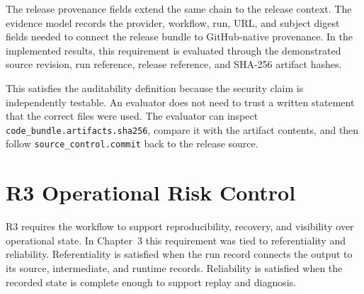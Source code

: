 The release provenance fields extend the same chain to the release context. The
evidence model records the provider, workflow, run, URL, and subject digest
fields needed to connect the release bundle to GitHub-native provenance. In
the implemented results, this requirement is evaluated through the demonstrated
source revision, run reference, release reference, and SHA-256 artifact hashes.

This satisfies the auditability definition because the security claim is
independently testable. An evaluator does not need to trust a written statement
that the correct files were used. The evaluator can inspect
\texttt{code\_bundle.artifacts.sha256}, compare it with the artifact contents,
and then follow \texttt{source\_control.commit} back to the release source.

\section{R3 Operational Risk Control}
\noindent
R3 requires the workflow to support reproducibility, recovery, and visibility
over operational state. In Chapter~3 this requirement was tied to
referentiality and reliability. Referentiality is satisfied when the run record
connects the output to its source, intermediate, and runtime records.
Reliability is satisfied when the recorded state is complete enough to support
replay and diagnosis.

